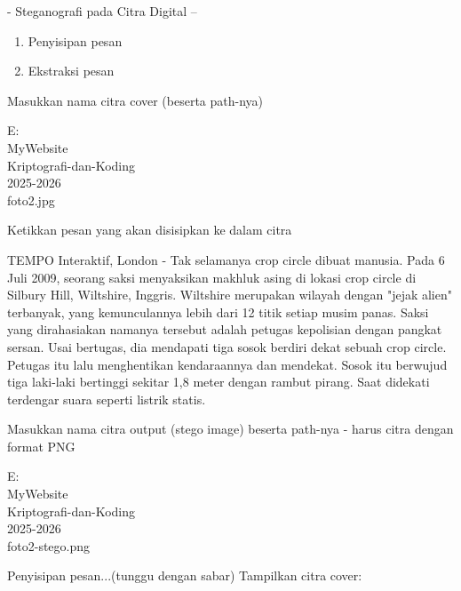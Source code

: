 \documentclass{article}
\begin{document}

- Steganografi pada Citra Digital --
\begin{enumerate}
  \item Penyisipan pesan
  \item Ekstraksi pesan
\end{enumerate}

Masukkan nama citra cover (beserta path-nya)

E:\\MyWebsite\\Kriptografi-dan-Koding\\2025-2026\\foto2.jpg

Ketikkan pesan yang akan disisipkan ke dalam citra

TEMPO Interaktif, London - Tak selamanya crop circle dibuat manusia. Pada 6 Juli 2009, seorang saksi menyaksikan makhluk asing di lokasi crop circle di Silbury Hill, Wiltshire, Inggris. Wiltshire merupakan wilayah dengan "jejak alien" terbanyak, yang kemunculannya lebih dari 12 titik setiap musim panas. Saksi yang dirahasiakan namanya tersebut adalah petugas kepolisian dengan pangkat sersan. Usai bertugas, dia mendapati tiga sosok berdiri dekat sebuah crop circle. Petugas itu lalu menghentikan kendaraannya dan mendekat. Sosok itu berwujud tiga laki-laki bertinggi sekitar 1,8 meter dengan rambut pirang. Saat didekati terdengar suara seperti listrik statis.

Masukkan nama citra output (stego image) beserta path-nya - harus citra dengan format PNG

E:\\MyWebsite\\Kriptografi-dan-Koding\\2025-2026\\foto2-stego.png

Penyisipan pesan...(tunggu dengan sabar)
Tampilkan citra cover:
\end{document}
